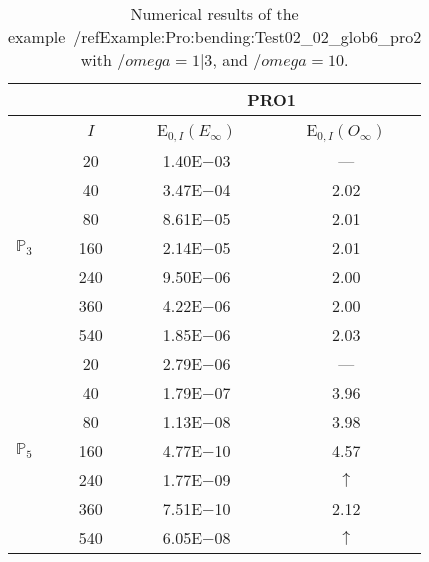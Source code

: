 \begin{table}[H]
\caption{Numerical results of the example~/ref{Example:Pro:bending:Test02_02_glob6_pro2} with $/omega=1|3$, and $/omega=10$.}
\setlength{\tabcolsep}{5pt}
\centering
\begin{tabular}{@{}l c c c@{}}
\toprule
 &  & \multicolumn{2}{c}{PRO1}\\
\midrule
 & $I$ & E$_{0,I}(E_{\infty})$ & E$_{0,I}(O_{\infty})$\\
\midrule
\multirow{7}{*}{$\mathbb{P}_{3}$}
 & 20 & 1.40E$-$03 & ---\\
 & 40 & 3.47E$-$04 & 2.02\\
 & 80 & 8.61E$-$05 & 2.01\\
 & 160 & 2.14E$-$05 & 2.01\\
 & 240 & 9.50E$-$06 & 2.00\\
 & 360 & 4.22E$-$06 & 2.00\\
 & 540 & 1.85E$-$06 & 2.03\\
\midrule
\multirow{7}{*}{$\mathbb{P}_{5}$}
 & 20 & 2.79E$-$06 & ---\\
 & 40 & 1.79E$-$07 & 3.96\\
 & 80 & 1.13E$-$08 & 3.98\\
 & 160 & 4.77E$-$10 & 4.57\\
 & 240 & 1.77E$-$09 & $\uparrow$\\
 & 360 & 7.51E$-$10 & 2.12\\
 & 540 & 6.05E$-$08 & $\uparrow$\\
\bottomrule
\end{tabular}
\label{Table:PRO:test_02_02_test24_pro2}
\end{table}
